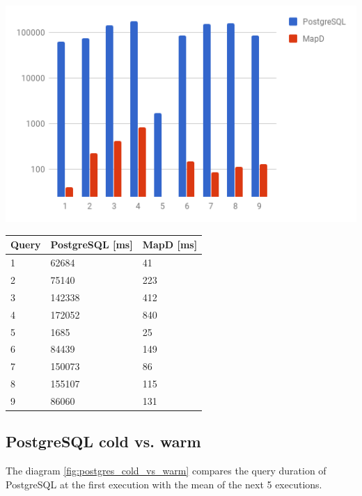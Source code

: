 \begin{minipage}{\textwidth}
  \begin{minipage}[b]{0.59\textwidth}
    \centering
     \includegraphics[width=1.0\textwidth,height=1.0\textheight,keepaspectratio]{images/warm_postgres_vs_mapd.png}
    \label{fig:warm_postgres_vs_mapd}
  \end{minipage}
  \hfill
  \begin{minipage}[b]{0.39\textwidth}
    \centering
  \begin{tabular}{ |p{1cm}|p{2cm}|p{2cm}| }
    \hline
    Query & PostgreSQL [ms] & MapD [ms] \\
    \hline
    1 & 62684 & 41 \\
    2 & 75140 & 223 \\
    3 & 142338 & 412 \\
    4 & 172052 & 840 \\
    5 & 1685 & 25 \\
    6 & 84439 & 149 \\
    7 & 150073 & 86 \\
    8 & 155107 & 115 \\
    9 & 86060 & 131 \\
    \hline
\end{tabular}
            \label{tab:warm_postgres_vs_mapd}
    \end{minipage}
 \end{minipage}



\subsection{PostgreSQL cold vs. warm}
The diagram \ref{fig:postgres_cold_vs_warm} compares the query duration of PostgreSQL at the first execution with the mean of the next 5 executions.

